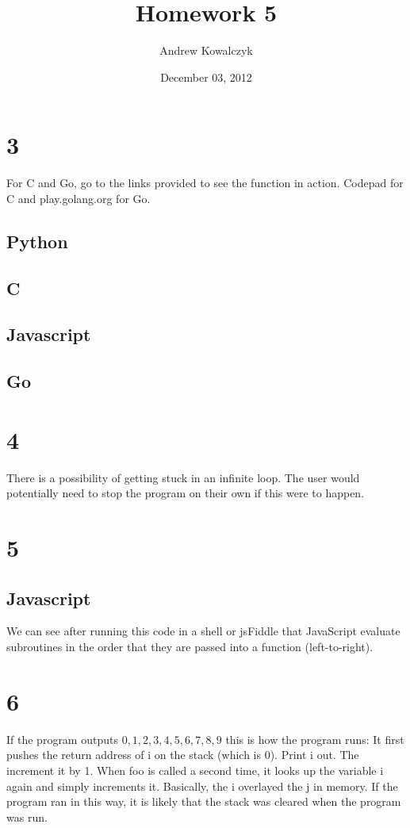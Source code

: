 \documentclass[11pt, oneside]{article}
\title{Homework 5}
\author{Andrew Kowalczyk}
\date{December 03, 2012}							%
\begin{document}
\maketitle

\section*{3}
For C and Go, go to the links provided to see the function in action. Codepad for C and play.golang.org for Go.

\subsection*{Python}


\subsection*{C}


\subsection*{Javascript}


\subsection*{Go}


\section*{4}
There is a possibility of getting stuck in an infinite loop. The user would potentially need to stop the program on their own if this were to happen.

\section*{5}
\subsection*{Javascript}


We can see after running this code in a shell or jsFiddle that JavaScript evaluate subroutines in the order that they are passed into a function (left-to-right).

\section*{6}
If the program outputs $0, 1, 2, 3, 4, 5, 6, 7, 8, 9$ this is how the program runs: It first pushes the return address of i on the stack (which is 0). Print i out. The increment it by 1. When foo is called a second time, it looks up the variable i again and simply increments it. Basically, the i overlayed the j in memory. If the program ran in this way, it is likely that the stack was cleared when the program was run.
\end{document}
